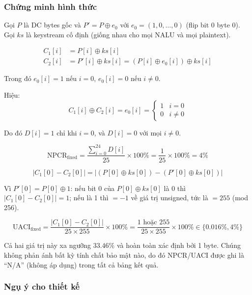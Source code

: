 \subsubsection{Chứng minh hình thức}

Gọi $P$ là DC bytes gốc và $P' = P \oplus e_0$ với $e_0 = (1, 0, \ldots, 0)$ (flip bit 0 byte 0).
Gọi $ks$ là keystream cố định (giống nhau cho mọi NALU và mọi plaintext).

\begin{align}
C_1[i] &= P[i] \oplus ks[i] \label{eq:c1} \\
C_2[i] &= P'[i] \oplus ks[i] = (P[i] \oplus e_0[i]) \oplus ks[i] \label{eq:c2}
\end{align}

Trong đó $e_0[i] = 1$ nếu $i = 0$, $e_0[i] = 0$ nếu $i \neq 0$.

Hiệu:
\begin{equation}
C_1[i] \oplus C_2[i] = e_0[i] = \begin{cases} 1 & i = 0 \\ 0 & i \neq 0 \end{cases}
\end{equation}

Do đó $D[i] = 1$ chỉ khi $i = 0$, và $D[i] = 0$ với mọi $i \neq 0$.

\begin{equation}
\text{NPCR}_{\text{fixed}} = \frac{\sum_{i=0}^{24} D[i]}{25} \times 100\%
= \frac{1}{25} \times 100\% = 4\%
\end{equation}

\begin{equation}
|C_1[0] - C_2[0]| = |(P[0] \oplus ks[0]) - (P'[0] \oplus ks[0])|
\end{equation}

Vì $P'[0] = P[0] \oplus 1$: nếu bit 0 của $P[0] \oplus ks[0]$ là 0 thì $|C_1[0] - C_2[0]| = 1$;
nếu là 1 thì $= -1$ về giá trị unsigned, tức là $= 255$ (mod 256).

\begin{equation}
\text{UACI}_{\text{fixed}} = \frac{|C_1[0] - C_2[0]|}{25 \times 255} \times 100\%
= \frac{1 \text{ hoặc } 255}{25 \times 255} \times 100\% \in \{0.016\%, 4\%\}
\end{equation}

Cả hai giá trị này xa ngưỡng $33.46\%$ và hoàn toàn xác định bởi 1 byte.
Chúng không phản ánh bất kỳ tính chất bảo mật nào, do đó NPCR/UACI được ghi
là ``N/A'' (không áp dụng) trong tất cả bảng kết quả.

\subsubsection{Ngụ ý cho thiết kế}

